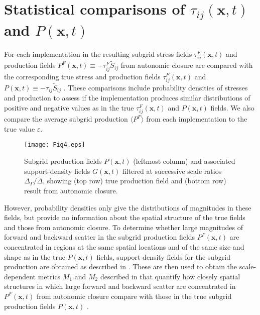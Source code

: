 \section{Statistical comparisons of $\tau_{ij}(\mathbf{x},t)$  and  $P(\mathbf{x},t)$ } 
\label{sec:IIIB}

For each implementation in  the resulting subgrid stress fields  $\tau_{ij}^{F}(\mathbf{x},t)$   and production fields $P^{F}(\mathbf{x},t) \equiv -\tau_{ij}^{F} \widetilde{S}_{ij}$ from autonomic closure are compared with the corresponding true stress and production fields  $\tau_{ij}^{F}(\mathbf{x},t)$  and $P(\mathbf{x},t) \equiv -\tau_{ij} \widetilde{S}_{ij}$  . These comparisons include probability densities of stresses and production to assess if the implementation produces similar distributions of positive and negative values as in the true $\tau_{ij}^{F}(\mathbf{x},t)$  and  $P(\mathbf{x},t)$ fields. We also compare the average subgrid production $\langle P^F \rangle$  from each implementation to the true value $\varepsilon$.

%
\begin{figure}
	\begin{center}
	\texttt{[image: Fig4.eps]}
	\caption{ Subgrid production fields $P(\mathbf{x},t)$ (leftmost column) and associated support-density fields $G(\mathbf{x},t)$ filtered at successive scale ratios $\Delta_{\Gamma}/\widetilde{\Delta}$, showing (top row) true production field and (bottom row) result from autonomic closure. }
	\label{F:4}
	\end{center}
\end{figure}
%
%
However, probability densities only give the distributions of magnitudes in these fields, but provide no information about the spatial structure of the true fields and those from autonomic closure. To determine whether large magnitudes of forward and backward scatter in the subgrid production fields $P^{F}(\mathbf{x},t)$  are concentrated in regions at the same spatial locations and of the same size and shape as in the true $P(\mathbf{x},t)$  fields, support-density fields for the subgrid production are obtained as described in . These are then used to obtain the scale-dependent metrics $M_1$  and $M_2$  described in  that quantify how closely spatial structures in which large forward and backward scatter are concentrated in $P^{F}(\mathbf{x},t)$  from autonomic closure compare with those in the true subgrid production fields $P(\mathbf{x},t)$ .


